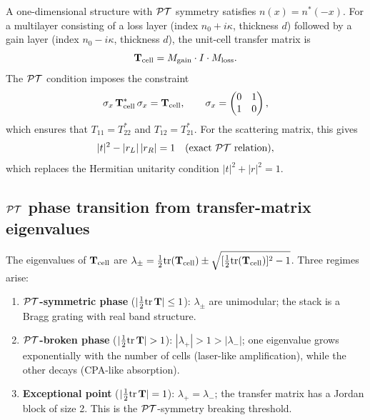 A one-dimensional structure with $\mathcal{PT}$ symmetry satisfies
$n(x) = n^*(-x)$. For a multilayer consisting of a loss layer
(index $n_0 + i\kappa$, thickness $d$) followed by a gain layer
(index $n_0 - i\kappa$, thickness $d$), the unit-cell transfer
matrix is
\begin{equation}
 \mathbf{T}_{\mathrm{cell}} = M_{\mathrm{gain}} \cdot I \cdot
 M_{\mathrm{loss}}.
 \label{eq:pt-unit-cell}
\end{equation}
The $\mathcal{PT}$ condition imposes the constraint
\begin{equation}
 \sigma_x\,\mathbf{T}_{\mathrm{cell}}^*\,\sigma_x = \mathbf{T}_{\mathrm{cell}},
 \qquad \sigma_x = \begin{pmatrix} 0 & 1 \\ 1 & 0 \end{pmatrix},
 \label{eq:pt-transfer-constraint}
\end{equation}
which ensures that $T_{11} = T_{22}^*$ and $T_{12} = T_{21}^*$. For
the scattering matrix, this gives
\begin{equation}
 |t|^2 - |r_L|\,|r_R| = 1
 \quad\text{(exact $\mathcal{PT}$ relation)},
 \label{eq:pt-unitarity}
\end{equation}
which replaces the Hermitian unitarity condition $|t|^2 + |r|^2 = 1$.


\subsection{$\mathcal{PT}$ phase transition from transfer-matrix eigenvalues}
\label{ssec:pt-phases}

The eigenvalues of $\mathbf{T}_{\mathrm{cell}}$ are
$\lambda_\pm = \tfrac{1}{2}\mathrm{tr}(\mathbf{T}_{\mathrm{cell}})
\pm \sqrt{[\tfrac{1}{2}\mathrm{tr}(\mathbf{T}_{\mathrm{cell}})]^2 - 1}$.
Three regimes arise:
\begin{enumerate}
 \item \textbf{$\mathcal{PT}$-symmetric phase}
 ($|\tfrac{1}{2}\mathrm{tr}\,\mathbf{T}| \le 1$):
 $\lambda_\pm$ are unimodular; the stack is a Bragg grating with
 real band structure.
 \item \textbf{$\mathcal{PT}$-broken phase}
 ($|\tfrac{1}{2}\mathrm{tr}\,\mathbf{T}| > 1$):
 $|\lambda_+| > 1 > |\lambda_-|$; one eigenvalue grows exponentially
 with the number of cells (laser-like amplification), while the
 other decays (CPA-like absorption).
 \item \textbf{Exceptional point}
 ($|\tfrac{1}{2}\mathrm{tr}\,\mathbf{T}| = 1$):
 $\lambda_+ = \lambda_-$; the transfer matrix has a Jordan block
 of size 2. This is the $\mathcal{PT}$-symmetry breaking threshold.
\end{enumerate}


